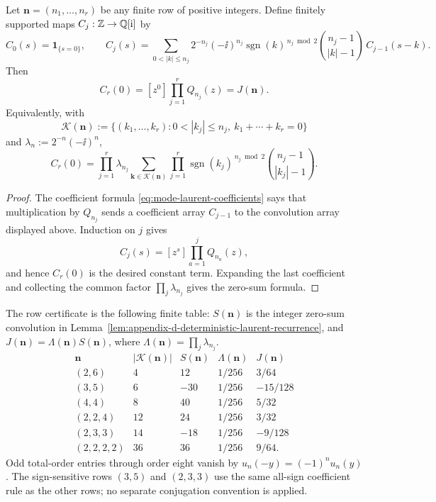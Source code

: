 \begin{lemma}%
\label{lem:appendix-d-deterministic-laurent-recurrence}
Let \(\mathbf n=(n_1,\ldots,n_r)\) be any finite row of positive integers.
Define finitely supported maps \(C_j:\mathbb{Z}\to\mathbb{Q}[\mathrm{i}]\) by
\[
C_0(s)=\mathbf 1_{\{s=0\}},\qquad
C_j(s)=\sum_{0<|k|\le n_j}
2^{-n_j}(-\ii)^{n_j}\operatorname{sgn}(k)^{\,n_j\bmod2}
\binom{n_j-1}{|k|-1}\,C_{j-1}(s-k).
\]
Then
\[
  C_r(0)=[z^0]\prod_{j=1}^r Q_{n_j}(z)=J(\mathbf n).
\]
Equivalently, with
\[
\mathcal K(\mathbf n)
:=\{(k_1,\ldots,k_r):0<|k_j|\le n_j,\ k_1+\cdots+k_r=0\}
\]
and \(\lambda_n:=2^{-n}(-\ii)^n\),
\[
C_r(0)=
\prod_{j=1}^r\lambda_{n_j}
\sum_{\mathbf k\in\mathcal K(\mathbf n)}
\prod_{j=1}^r
\operatorname{sgn}(k_j)^{\,n_j\bmod2}
\binom{n_j-1}{|k_j|-1}.
\]
\end{lemma}

\begin{proof}
The coefficient formula \eqref{eq:mode-laurent-coefficients} says that
multiplication by \(Q_{n_j}\) sends a coefficient array \(C_{j-1}\) to the
convolution array displayed above.  Induction on \(j\) gives
\[
  C_j(s)=[z^s]\prod_{a=1}^jQ_{n_a}(z),
\]
and hence \(C_r(0)\) is the desired constant term.  Expanding the last
coefficient and collecting the common factor
\(\prod_j\lambda_{n_j}\) gives the zero-sum formula.
\end{proof}

The row certificate is the following finite table: \(S(\mathbf n)\) is the
integer zero-sum convolution in
Lemma~\ref{lem:appendix-d-deterministic-laurent-recurrence}, and
\(J(\mathbf n)=\Lambda(\mathbf n)S(\mathbf n)\), where
\(\Lambda(\mathbf n)=\prod_j\lambda_{n_j}\).
\[
\begin{array}{c|r|r|c|c}
\mathbf n&|\mathcal K(\mathbf n)|&S(\mathbf n)&\Lambda(\mathbf n)&J(\mathbf n)\\
\hline
(2,6)&4&12&1/256&3/64\\
(3,5)&6&-30&1/256&-15/128\\
(4,4)&8&40&1/256&5/32\\
(2,2,4)&12&24&1/256&3/32\\
(2,3,3)&14&-18&1/256&-9/128\\
(2,2,2,2)&36&36&1/256&9/64 .
\end{array}
\]
Odd total-order entries through order eight vanish by
\(u_n(-y)=(-1)^nu_n(y)\).  The sign-sensitive rows
\((3,5)\) and \((2,3,3)\) use the same all-sign coefficient rule as the
other rows; no separate conjugation convention is applied.

